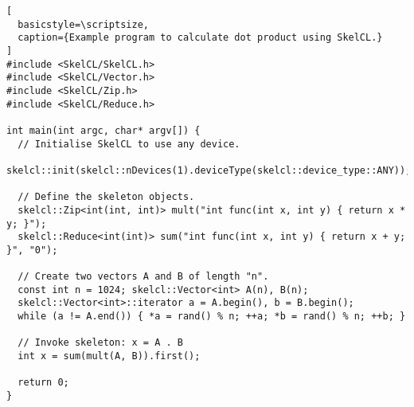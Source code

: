 \lstset{language=C++}
\begin{lstlisting}[
  basicstyle=\scriptsize,
  caption={Example program to calculate dot product using SkelCL.}
]
#include <SkelCL/SkelCL.h>
#include <SkelCL/Vector.h>
#include <SkelCL/Zip.h>
#include <SkelCL/Reduce.h>

int main(int argc, char* argv[]) {
  // Initialise SkelCL to use any device.
  skelcl::init(skelcl::nDevices(1).deviceType(skelcl::device_type::ANY));

  // Define the skeleton objects.
  skelcl::Zip<int(int, int)> mult("int func(int x, int y) { return x * y; }");
  skelcl::Reduce<int(int)> sum("int func(int x, int y) { return x + y; }", "0");

  // Create two vectors A and B of length "n".
  const int n = 1024; skelcl::Vector<int> A(n), B(n);
  skelcl::Vector<int>::iterator a = A.begin(), b = B.begin();
  while (a != A.end()) { *a = rand() % n; ++a; *b = rand() % n; ++b; }

  // Invoke skeleton: x = A . B
  int x = sum(mult(A, B)).first();

  return 0;
}
\end{lstlisting}
